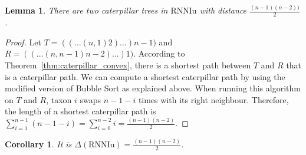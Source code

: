 \documentclass{amsart}
\newcommand{\rnniu}{\mathrm{RNNIu}}
\newtheorem{lemma}[definition]{Lemma}
\newtheorem{corollary}[definition]{Corollary}
\begin{document}
\begin{lemma}
	There are two caterpillar trees in $\rnniu$ with distance $\frac{(n-1)(n-2))}{2}$.
	\label{conj:caterpillar_diameter}
\end{lemma}


\begin{proof}
	Let $T = (( \dots (n,1)2)\dots)n-1)$ and $R = (( \dots (n,n-1)n-2)\dots)1)$.
    According to Theorem~\ref{thm:caterpillar_convex}, there is a shortest path between $T$ and $R$ that is a caterpillar path.
    We can compute a shortest caterpillar path by using the modified version of Bubble Sort as explained above. 
    When running this algorithm on $T$ and $R$, taxon $i$ swaps $n-1-i$ times with its right neighbour.
    Therefore, the length of a shortest caterpillar path is $\sum\limits_{i=1}^{n-1}(n-1-i) = \sum\limits_{i=0}^{n-2}i = \frac{(n-1)(n-2)}{2}$.
\end{proof}

\begin{corollary}
    It is $\Delta(\rnniu) = \frac{(n-1)(n-2)}{2}$.
\end{corollary}

\end{document}
